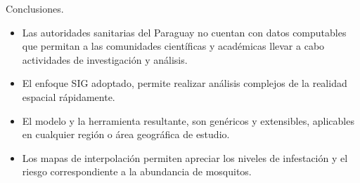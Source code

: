 \begin{frame}[t]{Conclusiones.}
    \begin{itemize}
        \item Las autoridades sanitarias del Paraguay no cuentan con datos computables que permitan a las comunidades científicas y académicas llevar a cabo actividades de investigación y análisis.

        \item El enfoque SIG adoptado, permite realizar análisis complejos de la realidad espacial rápidamente.


        \item El modelo y la herramienta resultante, son genéricos y extensibles, aplicables en cualquier región o área geográfica de estudio.

        \item Los mapas de interpolación permiten apreciar los niveles de infestación y el riesgo correspondiente a la abundancia de mosquitos.

    \end{itemize}
\end{frame}

